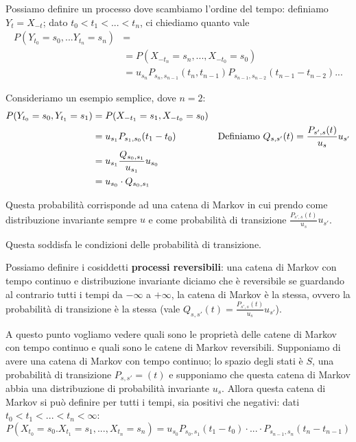 \documentclass[a4paper,12pt]{book}
\begin{document}
Possiamo definire un processo dove scambiamo l'ordine del tempo: definiamo $ Y_t = X_{-t} $; dato $ t_0 < t_1 < ... < t_n $, ci chiediamo quanto vale
\begin{align*}
	P(Y_{t_0} = s_0,  ... Y_{t_n} = s_n) & =  \\
	  & = P(X_{-t_n} = s_n, ..., X_{-t_0} = s_0) \\
	&  = u_{s_n}P_{s_n, s_{n-1}}(t_n, t_{n-1}) P_{s_{n-1}, s_{n-2}}(t_{n-1} - t_{n-2}) ...
\end{align*}

Consideriamo un esempio semplice, dove $ n=2 $:
\begin{align*}
	P(Y_{t_0} = s_0, Y_{t_1} = s_1) & = P(X_{-t_1} = s_1, X_{-t_0} = s_0) \\
	& = u_{s_1} P_{s_1, s_0}(t_1 - t_0) & \textnormal{Definiamo } Q_{s,s'}(t) = \frac{P_{s',s}(t)}{u_s} u_{s'} \\
	& = u_{s_1}\frac{Q_{s_0, s_1}}{u_{s_1}}u_{s_0} \\
	& = u_{s_0} \cdot Q_{s_0, s_1}
\end{align*}

Questa probabilità corrisponde ad una catena di Markov in cui prendo come distribuzione invariante sempre $ u $ e come probabilità di transizione $ \frac{P_{s',s}(t)}{u_s}u_{s'} $.

Questa soddisfa le condizioni delle probabilità di transizione. 

Possiamo definire i cosiddetti \textbf{processi reversibili}: una catena di Markov con tempo continuo e distribuzione invariante diciamo che è reversibile se guardando al contrario tutti i tempi da $ -\infty $ a $ +\infty $, la catena di Markov è la stessa, ovvero la probabilità di transizione è la stessa (vale $  Q_{s,s'}(t) = \frac{P_{s',s}(t)}{u_s} u_{s'} $).

A questo punto vogliamo vedere quali sono le proprietà delle catene di Markov con tempo continuo e quali sono le catene di Markov reversibili. Supponiamo di avere una catena di Markov con tempo continuo; lo spazio degli stati è $ S $, una probabilità di transizione $ P_{s,s'} = (t) $ e supponiamo che questa catena di Markov abbia una distribuzione di probabilità invariante $ u_s $. Allora questa catena di Markov si può definire per tutti i tempi, sia positivi che negativi: dati $ t_0 < t_1 < ... < t_n < \infty$:
$$ P(X_{t_0}=s_0. X_{t_1} = s_1, ... , X_{t_n} = s_n) = u_{s_0} P_{s_0, s_1}(t_1 - t_0) \cdot ... \cdot P_{s_{n-1}, s_n}(t_n - t_{n-1})$$
\end{document}
